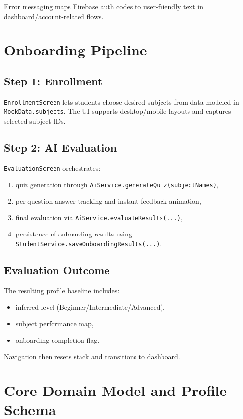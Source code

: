 \documentclass[11pt,a4paper]{article}
\begin{document}
Error messaging maps Firebase auth codes to user-friendly text in dashboard/account-related flows.

\section{Onboarding Pipeline}
\subsection{Step 1: Enrollment}
\texttt{EnrollmentScreen} lets students choose desired subjects from data modeled in \texttt{MockData.subjects}. The UI supports desktop/mobile layouts and captures selected subject IDs.

\subsection{Step 2: AI Evaluation}
\texttt{EvaluationScreen} orchestrates:
\begin{enumerate}
  \item quiz generation through \texttt{AiService.generateQuiz(subjectNames)},
  \item per-question answer tracking and instant feedback animation,
  \item final evaluation via \texttt{AiService.evaluateResults(...)},
  \item persistence of onboarding results using \texttt{StudentService.saveOnboardingResults(...)}.
\end{enumerate}

\subsection{Evaluation Outcome}
The resulting profile baseline includes:
\begin{itemize}
  \item inferred level (Beginner/Intermediate/Advanced),
  \item subject performance map,
  \item onboarding completion flag.
\end{itemize}

Navigation then resets stack and transitions to dashboard.

\section{Core Domain Model and Profile Schema}
\end{document}

